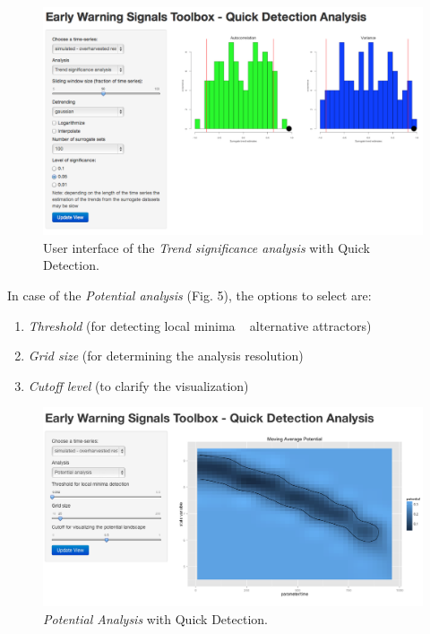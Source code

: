 \documentclass[12pt,a4paper,final]{article}
\begin{document}
\begin{doublespacing}
\begin{figure}[ht]
\begin{center}
\includegraphics[scale=0.4]{demo_significance2.png}
\caption{User interface of the \textit{Trend significance analysis} with Quick Detection.}
\end{center}
\end{figure}
\newpage
In case of the \textit{Potential analysis} (Fig. 5), the options to select are:
\begin{enumerate}
\item \textit{Threshold} (for detecting local minima ~ alternative attractors)
\item \textit{Grid size} (for determining the analysis resolution)
\item \textit{Cutoff level} (to clarify the visualization)
\end{enumerate}

\begin{figure}[ht]
\begin{center}
\includegraphics[scale=0.4]{demo_potential.png}
\caption{\textit{Potential Analysis} with Quick Detection.}
\end{center}
\end{figure}

\end{doublespacing}
\end{document}
